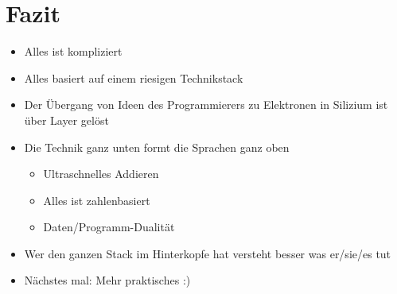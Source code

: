 \documentclass{beamer}
\begin{document}
\section{Fazit}
\begin{frame}{\secname}
  \begin{itemize}
  \item Alles ist kompliziert
  \item Alles basiert auf einem riesigen Technikstack
  \item Der Übergang von Ideen des Programmierers zu Elektronen in Silizium ist über Layer gelöst
  \item Die Technik ganz unten formt die Sprachen ganz oben
    \begin{itemize}
    \item Ultraschnelles Addieren
    \item Alles ist zahlenbasiert
    \item Daten/Programm-Dualität
    \end{itemize}
  \item Wer den ganzen Stack im Hinterkopfe hat versteht besser was er/sie/es tut
  \item Nächstes mal: Mehr praktisches :)
  \end{itemize}
\end{frame}
\end{document}

